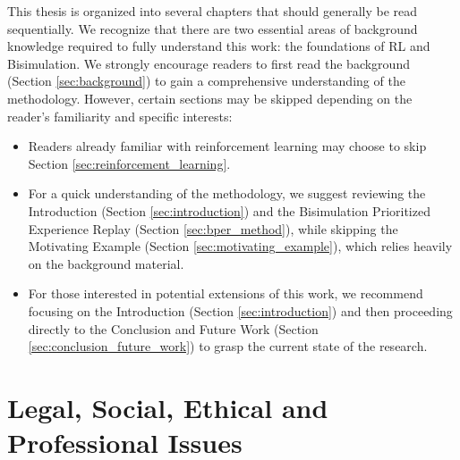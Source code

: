 This thesis is organized into several chapters that should generally be read sequentially. We recognize that there are two essential areas of background knowledge required to fully understand this work: the foundations of RL and Bisimulation. We strongly encourage readers to first read the background (Section \ref{sec:background}) to gain a comprehensive understanding of the methodology. However, certain sections may be skipped depending on the reader's familiarity and specific interests:

\begin{itemize} 
    \item Readers already familiar with reinforcement learning may choose to skip Section \ref{sec:reinforcement_learning}. 
    \item For a quick understanding of the methodology, we suggest reviewing the Introduction (Section \ref{sec:introduction}) and the Bisimulation Prioritized Experience Replay (Section \ref{sec:bper_method}), while skipping the Motivating Example (Section \ref{sec:motivating_example}), which relies heavily on the background material.
    \item For those interested in potential extensions of this work, we recommend focusing on the Introduction (Section \ref{sec:introduction}) and then proceeding directly to the Conclusion and Future Work (Section \ref{sec:conclusion_future_work}) to grasp the current state of the research. 
\end{itemize}




\section{Legal, Social, Ethical and Professional Issues}

